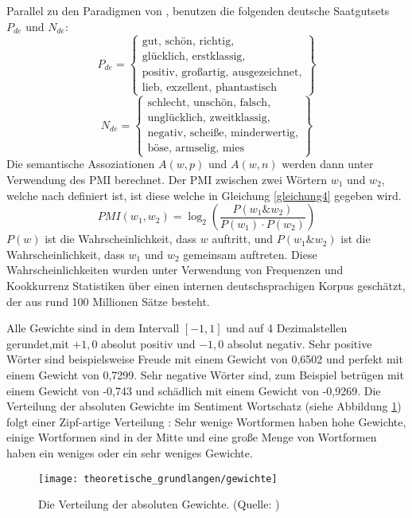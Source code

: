 Parallel zu den Paradigmen von \citet{turney2003measuring}, benutzen \citet{Remus2010} die folgenden deutsche Saatgutsets $P_{de}$ und $N_{de}$:
\begin{equation}
P_{de}=
	\begin{Bmatrix}
	\text{gut, schön, richtig,} \\
	\text{glücklich, erstklassig,}\\
	\text{positiv, großartig, ausgezeichnet,}\\
	\text{lieb, exzellent, phantastisch}
	\end{Bmatrix}
\label{gleichung2}
\end{equation}
\begin{equation}
N_{de}=
	\begin{Bmatrix}
	\text{schlecht, unschön, falsch,} \\
	\text{unglücklich, zweitklassig,}\\
	\text{negativ, scheiße, minderwertig,}\\
	\text{böse, armselig, mies}
	\end{Bmatrix}
\label{gleichung3}
\end{equation}
Die semantische Assoziationen $A(w, p)$ und $A(w, n)$ werden dann unter Verwendung des \ac{PMI} berechnet. Der PMI zwischen zwei Wörtern $w_1$ und $w_2$, welche nach \citet{church1990word} definiert ist, ist diese welche in Gleichung \ref{gleichung4} gegeben wird.
\begin{equation}
	PMI(w_1, w_2) = \log_2 {\left(\frac{P(w_1{\text{\&}}w_2)}{P(w_1){\cdot}P(w_2)}\right)}
\label{gleichung4}
\end{equation}
$P(w)$ ist die Wahrscheinlichkeit, dass $w$ auftritt, und $P(w_1{\text{\&}}w_2)$ ist die Wahrscheinlichkeit, dass $w_1$ und $w_2$ gemeinsam auftreten. Diese Wahrscheinlichkeiten wurden unter Verwendung von Frequenzen und Kookkurrenz Statistiken über einen internen deutschsprachigen Korpus geschätzt, der aus rund 100 Millionen Sätze besteht. \citep{Remus2010}

Alle Gewichte sind in dem Intervall $[-1, 1]$ und auf 4 Dezimalstellen gerundet,mit $+1,0$ absolut positiv und $-1,0$ absolut negativ. Sehr positive Wörter sind beispielsweise Freude mit einem Gewicht von 0,6502 und perfekt mit einem Gewicht von 0,7299. Sehr negative Wörter sind, zum Beispiel betrügen mit einem Gewicht von -0,743 und schädlich mit einem Gewicht von -0,9269. Die Verteilung der absoluten Gewichte im Sentiment Wortschatz (siehe Abbildung \ref{fig:Gewichte}) folgt einer Zipf-artige Verteilung \citep{zipf1949human}: Sehr wenige Wortformen haben hohe Gewichte, einige Wortformen sind in der Mitte und eine große Menge von Wortformen haben ein weniges oder ein sehr weniges Gewichte. \citep{Remus2010}
\begin{figure}[htb]
	\begin{center}
		\texttt{[image: theoretische\_grundlangen/gewichte]}
		\caption[Die Verteilung der absoluten Gewichte]{Die Verteilung der absoluten Gewichte. (Quelle: \citealp{Remus2010})}
		\label{fig:Gewichte}
	\end{center}
\end{figure}
